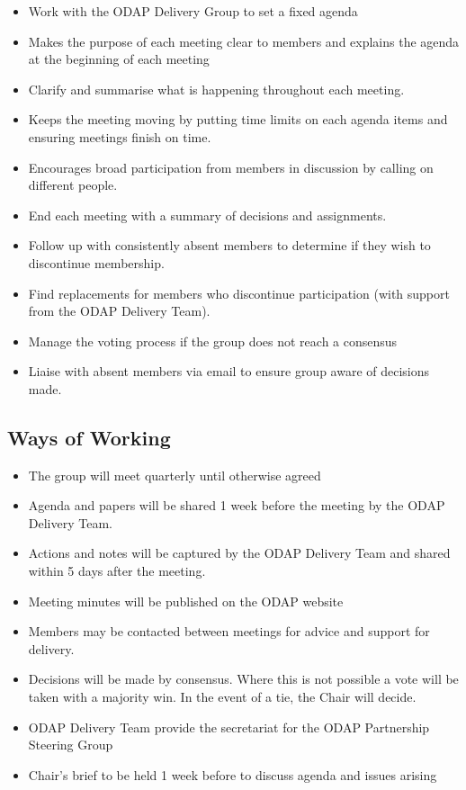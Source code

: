 \documentclass[
]{article}
\begin{document}
\begin{itemize}
\item
  Work with the ODAP Delivery Group to set a fixed agenda
\item
  Makes the purpose of each meeting clear to members and explains the
  agenda at the beginning of each meeting
\item
  Clarify and summarise what is happening throughout each meeting.
\item
  Keeps the meeting moving by putting time limits on each agenda items
  and ensuring meetings finish on time.
\item
  Encourages broad participation from members in discussion by calling
  on different people.
\item
  End each meeting with a summary of decisions and assignments.
\item
  Follow up with consistently absent members to determine if they wish
  to discontinue membership.
\item
  Find replacements for members who discontinue participation (with
  support from the ODAP Delivery Team).
\item
  Manage the voting process if the group does not reach a consensus
\item
  Liaise with absent members via email to ensure group aware of
  decisions made.
\end{itemize}

\hypertarget{ways-of-working}{%
\subsection{Ways of Working}\label{ways-of-working}}

\begin{itemize}
\item
  The group will meet quarterly until otherwise agreed
\item
  Agenda and papers will be shared 1 week before the meeting by the ODAP
  Delivery Team.
\item
  Actions and notes will be captured by the ODAP Delivery Team and
  shared within 5 days after the meeting.
\item
  Meeting minutes will be published on the ODAP website
\item
  Members may be contacted between meetings for advice and support for
  delivery.
\item
  Decisions will be made by consensus. Where this is not possible a vote
  will be taken with a majority win. In the event of a tie, the Chair
  will decide.
\item
  ODAP Delivery Team provide the secretariat for the ODAP Partnership
  Steering Group
\item
  Chair's brief to be held 1 week before to discuss agenda and issues
  arising
\end{itemize}
\end{document}
